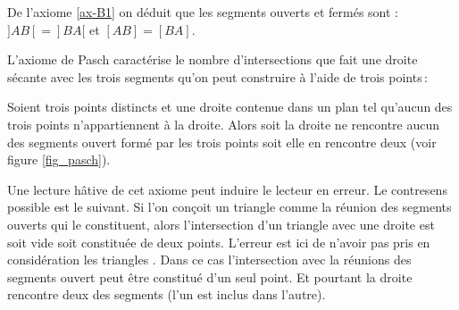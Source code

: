 \begin{rema}
    De l'axiome \ref{ax-B1} on déduit que les segments ouverts et fermés sont  : $]AB[=]BA[$ et $[AB]=[BA]$.
\end{rema}
L'axiome de Pasch caractérise le nombre d'intersections que fait une droite sécante avec les trois segments qu'on peut construire à l'aide de trois points\,: 
\setcounter{axi}{4}
\begin{axi}[Pasch]\label{ax-pasch}
    Soient trois points distincts et une droite contenue dans un plan tel qu'aucun des trois points n'appartiennent à la droite. Alors soit la droite ne rencontre aucun des segments ouvert formé par les trois points soit elle en rencontre deux (voir figure \ref{fig_pasch}).

\end{axi}
\begin{rema}
    Une lecture hâtive de cet axiome peut induire le lecteur en erreur. Le contresens possible est le suivant. Si l'on conçoit un triangle comme la réunion des segments ouverts qui le constituent, alors l'intersection d'un triangle avec une droite est soit vide soit constituée de deux points. L'erreur est ici de n'avoir pas pris en considération les triangles . Dans ce cas l'intersection avec la réunions des segments ouvert peut être constitué d'un seul point. Et pourtant la droite rencontre deux des segments (l'un est inclus dans l'autre).
\end{rema}
